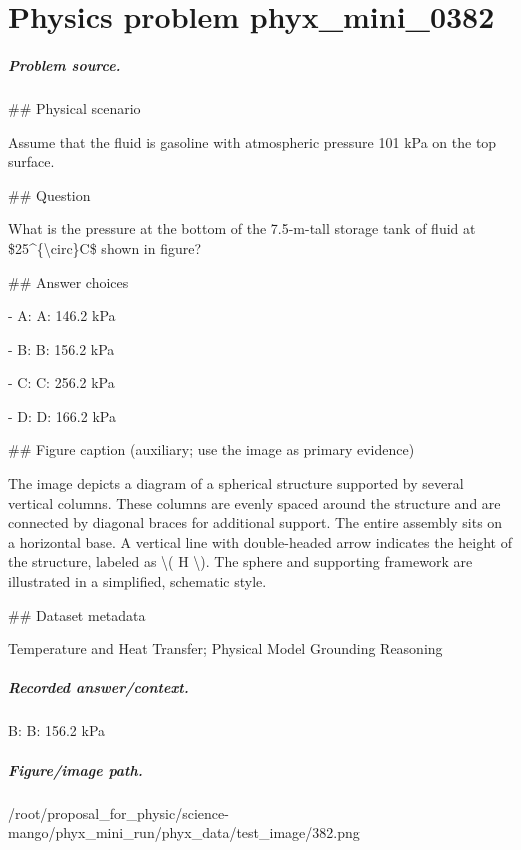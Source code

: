 
\chapter{Physics problem phyx\_mini\_0382}
\label{ch:PhyXMiniProblems_problem_phyx_mini_0382}

\paragraph{Problem source.}
\#\# Physical scenario

Assume that the fluid is gasoline with atmospheric pressure 101 kPa on the top surface.

\#\# Question

What is the pressure at the bottom of the 7.5-m-tall storage tank of fluid at \$25\textasciicircum{}\{\textbackslash{}circ\}C\$ shown in figure?

\#\# Answer choices

- A: A: 146.2 kPa

- B: B: 156.2 kPa

- C: C: 256.2 kPa

- D: D: 166.2 kPa

\#\# Figure caption (auxiliary; use the image as primary evidence)

The image depicts a diagram of a spherical structure supported by several vertical columns. These columns are evenly spaced around the structure and are connected by diagonal braces for additional support. The entire assembly sits on a horizontal base. A vertical line with double-headed arrow indicates the height of the structure, labeled as \textbackslash{}( H \textbackslash{}). The sphere and supporting framework are illustrated in a simplified, schematic style.

\#\# Dataset metadata

Temperature and Heat Transfer; Physical Model Grounding Reasoning

\paragraph{Recorded answer/context.}
B: B: 156.2 kPa

\paragraph{Figure/image path.}
/root/proposal\_for\_physic/science-mango/phyx\_mini\_run/phyx\_data/test\_image/382.png

